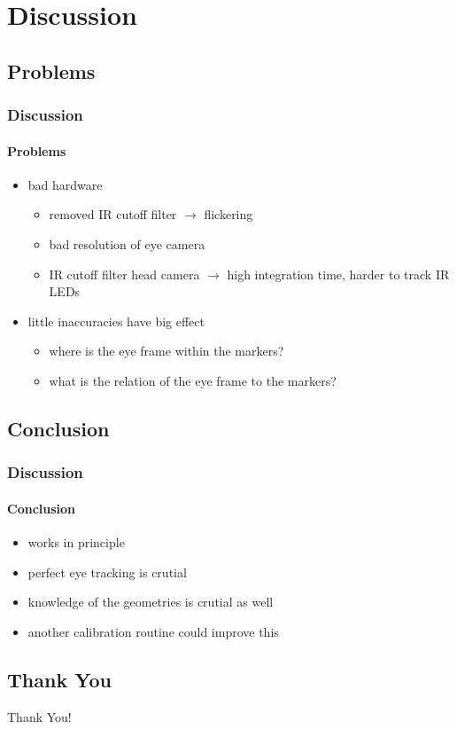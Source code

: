 \documentclass[%
14pt
]{beamer}
\begin{document}
\section{Discussion}
\subsection{Problems}
\begin{frame}
	\frametitle{Discussion}
  \framesubtitle{Problems}
  \begin{itemize}
    \item bad hardware
      \begin{itemize}
        \item removed IR cutoff filter $\rightarrow$ flickering
        \item bad resolution of eye camera
        \item IR cutoff filter head camera $\rightarrow$ high integration time, harder to track IR LEDs
      \end{itemize}
    \item little inaccuracies have big effect
      \begin{itemize}
        \item where is the eye frame within the markers?
        \item what is the relation of the eye frame to the markers?
      \end{itemize}
  \end{itemize}
\end{frame}
\subsection{Conclusion}
\begin{frame}
	\frametitle{Discussion}
  \framesubtitle{Conclusion}
  \begin{itemize}
    \item works in principle
    \item perfect eye tracking is crutial
    \item knowledge of the geometries is crutial as well
    \item another calibration routine could improve this
  \end{itemize}
\end{frame}


\subsection*{Thank You}
\begin{frame}
  \begin{center}
    \huge{Thank You!}
  \end{center}
\end{frame}
\end{document}
